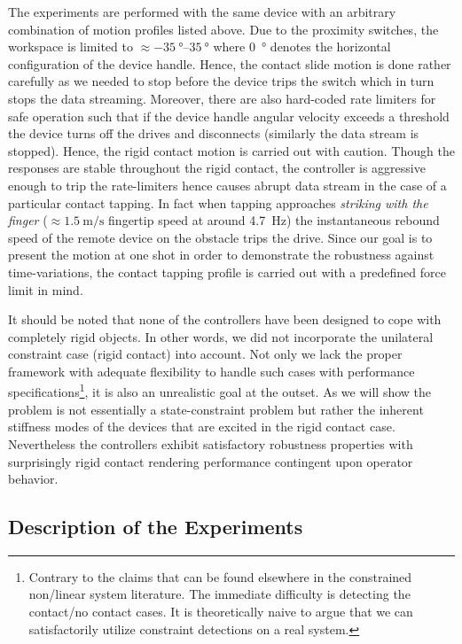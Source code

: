 The experiments are performed with the same device with an arbitrary combination of motion profiles listed above. Due to the
proximity switches, the workspace is limited to $\approx \SIrange{-35}{35}{\degree}$ where \SI{0}{\degree} denotes the horizontal 
configuration of the device handle. Hence, the contact slide motion is done rather carefully as we needed to stop before the device trips
the switch which in turn stops the data streaming. Moreover, there are also hard-coded rate limiters for safe operation such that if the 
device handle angular velocity exceeds a threshold the device turns off the drives and disconnects (similarly the data stream is stopped). 
Hence, the rigid contact motion is carried out with caution. Though the responses are stable throughout the rigid contact, the controller is 
aggressive enough to trip the rate-limiters hence causes abrupt data stream in the case of a particular contact tapping. In fact when tapping 
approaches \emph{striking with the finger} ($\approx \SI{1.5}{\meter\per\second}$ fingertip speed at around \SI{4.7}{\hertz}) the instantaneous
rebound speed of the remote device on the obstacle trips the drive. Since our goal is to present the motion at one shot in order to demonstrate 
the robustness against time-variations, the contact tapping profile is carried out with a predefined force limit in mind. 


It should be noted that none of the controllers have been designed to cope with completely rigid objects. In other words, we did not 
incorporate the unilateral constraint case (rigid contact) into account. Not only we lack the proper framework with adequate flexibility to handle such 
cases with performance specifications\footnote{Contrary to the claims that can be found elsewhere in the constrained non/linear system 
literature. The immediate difficulty is detecting the contact/no contact cases. It is theoretically naive to argue that we can satisfactorily 
utilize constraint detections on a real system.}, it is also an unrealistic goal at the outset. As we will show the problem is not essentially a state-constraint problem but 
rather the inherent stiffness modes of the devices that are excited in the rigid contact case. Nevertheless the controllers exhibit satisfactory 
robustness properties with surprisingly rigid contact rendering performance contingent upon operator behavior.  

\subsection{Description of the Experiments}

